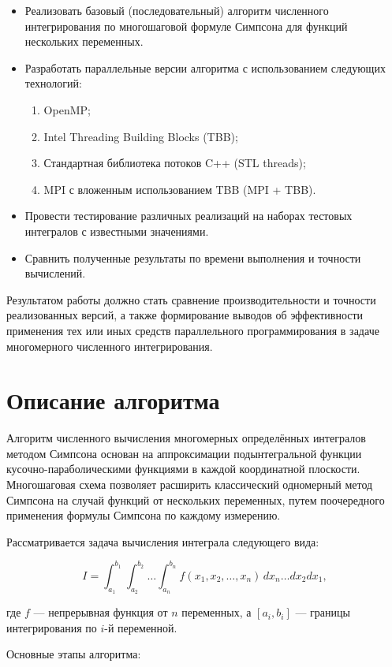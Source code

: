 \documentclass[14pt,a4paper]{extarticle}
\begin{document}
\begin{itemize}
\item Реализовать базовый (последовательный) алгоритм численного интегрирования по многошаговой формуле Симпсона для функций нескольких переменных.
\item Разработать параллельные версии алгоритма с использованием следующих технологий:
\begin{enumerate}
\item OpenMP;
\item Intel Threading Building Blocks (TBB);
\item Стандартная библиотека потоков C++ (STL threads);
\item MPI с вложенным использованием TBB (MPI + TBB).
\end{enumerate}
\item Провести тестирование различных реализаций на наборах тестовых интегралов с известными значениями.
\item Сравнить полученные результаты по времени выполнения и точности вычислений.
\end{itemize}

Результатом работы должно стать сравнение производительности и точности реализованных версий, а также формирование выводов об эффективности применения тех или иных средств параллельного программирования в задаче многомерного численного интегрирования.

\section{Описание алгоритма}

Алгоритм численного вычисления многомерных определённых интегралов методом Симпсона основан на аппроксимации подынтегральной функции кусочно-параболическими функциями в каждой координатной плоскости. Многошаговая схема позволяет расширить классический одномерный метод Симпсона на случай функций от нескольких переменных, путем поочередного применения формулы Симпсона по каждому измерению.

Рассматривается задача вычисления интеграла следующего вида:

\[
I = \int_{a_1}^{b_1} \int_{a_2}^{b_2} \dots \int_{a_n}^{b_n} f(x_1, x_2, \dots, x_n) \, dx_n \dots dx_2 dx_1,
\]

где $f$ — непрерывная функция от $n$ переменных, а $[a_i, b_i]$ — границы интегрирования по $i$-й переменной.

Основные этапы алгоритма:
\end{document}
